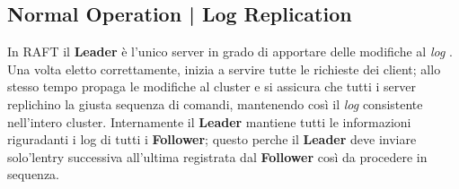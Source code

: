 \subsection{Normal Operation | Log Replication}
\label{Log Replication}
In RAFT il \textbf{Leader} è l'unico server in grado di apportare delle modifiche al \textit{log} . Una volta eletto correttamente, inizia a servire tutte le richieste dei client; allo stesso tempo propaga le modifiche al cluster e si assicura che tutti i server replichino la giusta sequenza di comandi, mantenendo così il \textit{log} consistente nell'intero cluster.
Internamente il \textbf{Leader} mantiene tutti le informazioni riguradanti i log di tutti i \textbf{Follower}; questo perche il \textbf{Leader} deve inviare solo'lentry successiva all'ultima registrata dal \textbf{Follower} così da procedere in sequenza.

